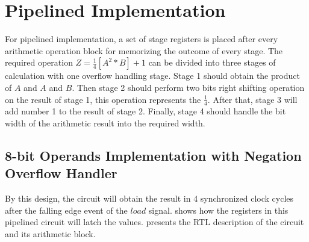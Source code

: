 \section{Pipelined Implementation}

For pipelined implementation, a set of stage registers is placed after every arithmetic operation block for memorizing the outcome of every stage.
The required operation \textbf{\(Z = \frac{1}{4} [A^2\ast B] + 1\)} can be divided into three stages of calculation with one overflow handling stage.
Stage 1 should obtain the product of \(A\) and \(A\) and \(B\).
Then stage 2 should perform two bits right shifting operation on the result of stage 1, this operation represents the \(\frac{1}{4}\).
After that, stage 3 will add number 1 to the result of stage 2.
Finally, stage 4 should handle the bit width of the arithmetic result into the required width.

\subsection{8-bit Operands Implementation with Negation Overflow Handler}

By this design, the circuit will obtain the result in 4 synchronized clock cycles after the falling edge event of the \(load\) signal.
 shows how the registers in this pipelined circuit will latch the values.
 presents the RTL description of the circuit and its arithmetic block.

